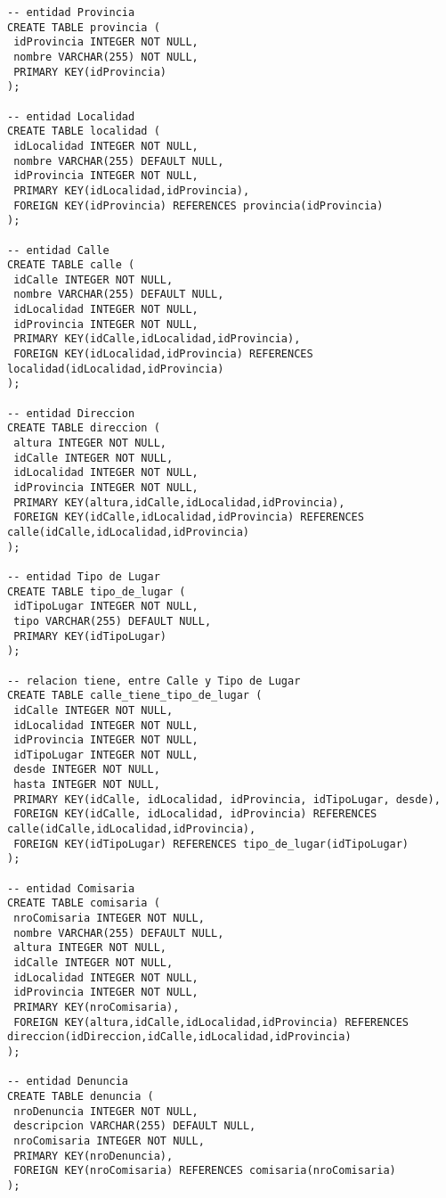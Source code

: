 \begin{verbatim}
-- entidad Provincia
CREATE TABLE provincia (
 idProvincia INTEGER NOT NULL,
 nombre VARCHAR(255) NOT NULL,
 PRIMARY KEY(idProvincia)
);

-- entidad Localidad
CREATE TABLE localidad (
 idLocalidad INTEGER NOT NULL,
 nombre VARCHAR(255) DEFAULT NULL,
 idProvincia INTEGER NOT NULL,
 PRIMARY KEY(idLocalidad,idProvincia),
 FOREIGN KEY(idProvincia) REFERENCES provincia(idProvincia)
);

-- entidad Calle
CREATE TABLE calle (
 idCalle INTEGER NOT NULL,
 nombre VARCHAR(255) DEFAULT NULL,
 idLocalidad INTEGER NOT NULL,
 idProvincia INTEGER NOT NULL,
 PRIMARY KEY(idCalle,idLocalidad,idProvincia),
 FOREIGN KEY(idLocalidad,idProvincia) REFERENCES localidad(idLocalidad,idProvincia)
);

-- entidad Direccion
CREATE TABLE direccion (
 altura INTEGER NOT NULL,
 idCalle INTEGER NOT NULL,
 idLocalidad INTEGER NOT NULL,
 idProvincia INTEGER NOT NULL,
 PRIMARY KEY(altura,idCalle,idLocalidad,idProvincia),
 FOREIGN KEY(idCalle,idLocalidad,idProvincia) REFERENCES calle(idCalle,idLocalidad,idProvincia)
);

-- entidad Tipo de Lugar
CREATE TABLE tipo_de_lugar (
 idTipoLugar INTEGER NOT NULL,
 tipo VARCHAR(255) DEFAULT NULL,
 PRIMARY KEY(idTipoLugar)
);

-- relacion tiene, entre Calle y Tipo de Lugar
CREATE TABLE calle_tiene_tipo_de_lugar (
 idCalle INTEGER NOT NULL,
 idLocalidad INTEGER NOT NULL,
 idProvincia INTEGER NOT NULL,
 idTipoLugar INTEGER NOT NULL,
 desde INTEGER NOT NULL,
 hasta INTEGER NOT NULL,
 PRIMARY KEY(idCalle, idLocalidad, idProvincia, idTipoLugar, desde),
 FOREIGN KEY(idCalle, idLocalidad, idProvincia) REFERENCES calle(idCalle,idLocalidad,idProvincia),
 FOREIGN KEY(idTipoLugar) REFERENCES tipo_de_lugar(idTipoLugar)
);

-- entidad Comisaria
CREATE TABLE comisaria (
 nroComisaria INTEGER NOT NULL,
 nombre VARCHAR(255) DEFAULT NULL,
 altura INTEGER NOT NULL,
 idCalle INTEGER NOT NULL,
 idLocalidad INTEGER NOT NULL,
 idProvincia INTEGER NOT NULL,
 PRIMARY KEY(nroComisaria),
 FOREIGN KEY(altura,idCalle,idLocalidad,idProvincia) REFERENCES direccion(idDireccion,idCalle,idLocalidad,idProvincia)
);

-- entidad Denuncia
CREATE TABLE denuncia (
 nroDenuncia INTEGER NOT NULL,
 descripcion VARCHAR(255) DEFAULT NULL,
 nroComisaria INTEGER NOT NULL,
 PRIMARY KEY(nroDenuncia),
 FOREIGN KEY(nroComisaria) REFERENCES comisaria(nroComisaria)
);


\end{verbatim}
